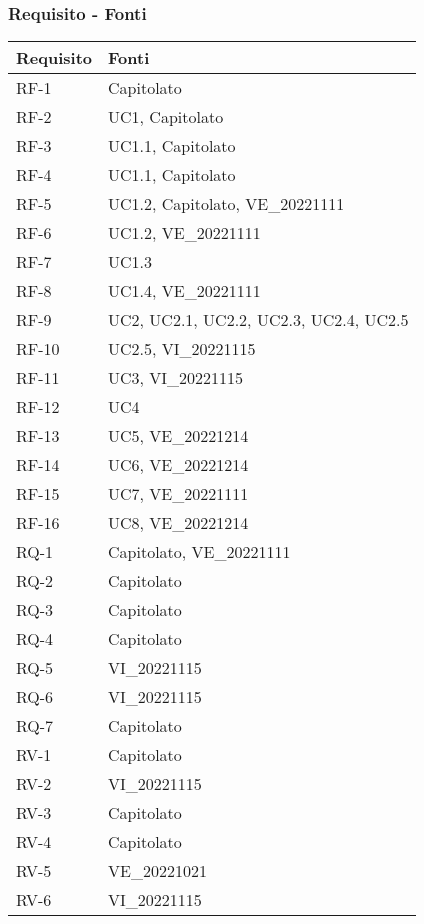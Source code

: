 \subsubsection{Requisito - Fonti}
\begin{table}[H]
	\centering
	\begin{tabular}{| p{} | p{} |} 
		\hline
		\textbf{Requisito} & \textbf{Fonti} \\
		\hline
		RF-1 & Capitolato\\
		\hline
		RF-2 & UC1, Capitolato\\
		\hline
		RF-3 & UC1.1, Capitolato\\
		\hline
		RF-4 & UC1.1, Capitolato\\
		\hline
		RF-5 & UC1.2, Capitolato, VE\_20221111\\
		\hline
		RF-6 & UC1.2, VE\_20221111\\
		\hline
		RF-7 & UC1.3\\
		\hline
		RF-8 & UC1.4, VE\_20221111\\
		\hline
		RF-9 & UC2, UC2.1, UC2.2, UC2.3, UC2.4, UC2.5\\
		\hline
		RF-10 & UC2.5, VI\_20221115\\
         \hline
		RF-11 & UC3, VI\_20221115\\
        \hline
		RF-12 & UC4\\
         \hline
		RF-13 & UC5, VE\_20221214\\
        \hline
		RF-14 & UC6, VE\_20221214\\
         \hline
		RF-15 & UC7, VE\_20221111\\
         \hline
		RF-16 & UC8, VE\_20221214\\
		\hline
		RQ-1 & Capitolato, VE\_20221111\\
		\hline
		RQ-2 & Capitolato\\
		\hline
		RQ-3 & Capitolato\\
		\hline
		RQ-4 & Capitolato\\
		\hline
		RQ-5 & VI\_20221115\\
		\hline
		RQ-6 & VI\_20221115\\
		\hline
		RQ-7 & Capitolato\\
		\hline
		RV-1 & Capitolato\\
		\hline
		RV-2 & VI\_20221115\\
		\hline
		RV-3 & Capitolato\\
		\hline
		RV-4 & Capitolato\\
		\hline
		RV-5 & VE\_20221021\\
		\hline
		RV-6 & VI\_20221115\\
		\hline
	\end{tabular}
\end{table}


